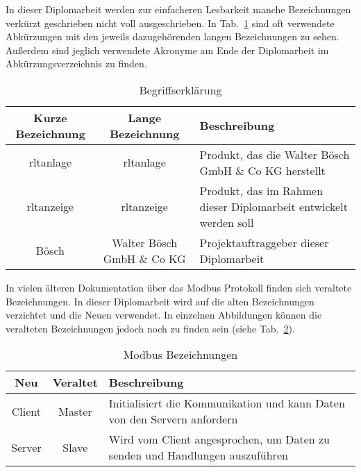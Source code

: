  \label{begriffserklaerung}

\noindent In dieser Diplomarbeit werden zur einfacheren Lesbarkeit manche Bezeichnungen verkürzt geschrieben \bzw nicht voll ausgeschrieben. In Tab.~\ref{tab:begriffserklaerung} sind oft verwendete Abkürzungen mit den jeweils dazugehörenden langen Bezeichnungen zu sehen. Außerdem sind jeglich verwendete Akronyme am Ende der Diplomarbeit im Abkürzungsverzeichnis zu finden. 
\begin{table}[h]
	\caption{Begriffserklärung \label{tab:begriffserklaerung}}
	\begin{tabularx}{\textwidth}{@{}c|c|X@{}}
		\toprule
		\textbf{Kurze Bezeichnung} & \textbf{Lange Bezeichnung} & \textbf{Beschreibung} \\
		\midrule
        \acs{rltanlage} & \Acl{rltanlage} &  Produkt, das die Walter Bösch GmbH \& Co KG herstellt \\
		\acs{rltanzeige} & \acl{rltanzeige} &  Produkt, das im Rahmen dieser Diplomarbeit entwickelt werden soll \\
		Bösch & Walter Bösch GmbH \& Co KG & Projektauftraggeber dieser Diplomarbeit \\
		\bottomrule
	\end{tabularx}
\end{table}


In vielen älteren Dokumentation über das Modbus Protokoll finden sich veraltete Bezeichnungen. In dieser Diplomarbeit wird auf die alten Bezeichnungen verzichtet und die Neuen verwendet. In einzelnen Abbildungen können die veralteten Bezeichnungen jedoch noch zu finden sein (siehe Tab.~\ref{tab:modbus_bezeichnung}). 
\begin{table}[h]
	\caption{Modbus Bezeichnungen \label{tab:modbus_bezeichnung}}
	\begin{tabularx}{\textwidth}{@{}c|c|X@{}}
		\toprule
		\textbf{Neu} & \textbf{Veraltet} & \textbf{Beschreibung} \\
		\midrule
		Client & Master & Initialisiert die Kommunikation und kann Daten von den Servern anfordern \\
		Server & Slave & Wird vom Client angesprochen, um Daten zu senden und Handlungen auszuführen \\
		\bottomrule
	\end{tabularx}
\end{table}


